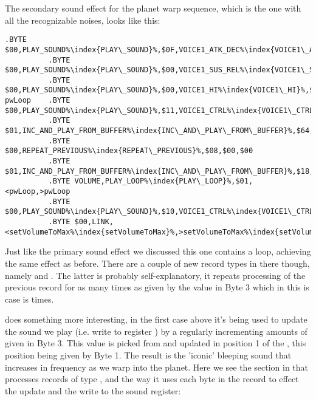 The secondary sound effect for the planet warp sequence, which is the one with all the recognizable noises, looks like this:

\begin{lstlisting}[escapechar=\%]
          .BYTE $00,PLAY_SOUND%\index{PLAY\_SOUND}%,$0F,VOICE1_ATK_DEC%\index{VOICE1\_ATK\_DEC}%,$00
          .BYTE $00,PLAY_SOUND%\index{PLAY\_SOUND}%,$00,VOICE1_SUS_REL%\index{VOICE1\_SUS\_REL}%,$00
          .BYTE $00,PLAY_SOUND%\index{PLAY\_SOUND}%,$00,VOICE1_HI%\index{VOICE1\_HI}%,$00
pwLoop    .BYTE $00,PLAY_SOUND%\index{PLAY\_SOUND}%,$11,VOICE1_CTRL%\index{VOICE1\_CTRL}%,$02
          .BYTE $01,INC_AND_PLAY_FROM_BUFFER%\index{INC\_AND\_PLAY\_FROM\_BUFFER}%,$64,VOICE1_HI%\index{VOICE1\_HI}%,$01
          .BYTE $00,REPEAT_PREVIOUS%\index{REPEAT\_PREVIOUS}%,$08,$00,$00
          .BYTE $01,INC_AND_PLAY_FROM_BUFFER%\index{INC\_AND\_PLAY\_FROM\_BUFFER}%,$18,VOICE1_HI%\index{VOICE1\_HI}%,$01
          .BYTE VOLUME,PLAY_LOOP%\index{PLAY\_LOOP}%,$01,<pwLoop,>pwLoop
          .BYTE $00,PLAY_SOUND%\index{PLAY\_SOUND}%,$10,VOICE1_CTRL%\index{VOICE1\_CTRL}%,$00
          .BYTE $00,LINK,<setVolumeToMax%\index{setVolumeToMax}%,>setVolumeToMax%\index{setVolumeToMax}%,$00
\end{lstlisting}

Just like the primary sound effect we discussed this one contains a loop, achieving the same effect as before. 
There are a couple of new record types in there though, namely  and .
The latter is probably self-explanatory, it repeats processing of the previous record for as many times as given by the 
value in Byte 3 which in this is case is  times.

 does something more interesting, in the first case above it's being used to update the sound we play
(i.e. write to register ) by a regularly incrementing amounts of  given in Byte 3. This value is picked
from and updated in position 1 of the , this position being given by Byte 1. The result is the 'iconic'
bleeping sound that increases in frequency as we warp into the planet. Here we see the section in  that
processes records of type , and the way it uses each byte in the record to effect the update
and the write to the sound register:

